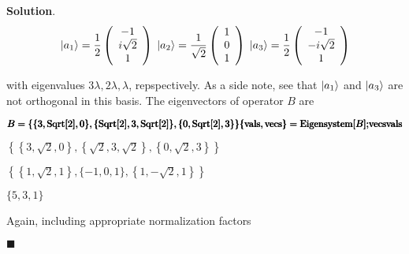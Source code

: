 \documentclass[12pt]{article}
\theoremstyle{definition}
\newenvironment{s}{%
        \begin{trivlist} \item \textbf{Solution}. }{%
            \hspace*{\fill} $\blacksquare$\end{trivlist}}%
\begin{document}
{\begin{s}
\begin{equation*}
\ket{a_{1}} = \frac{1}{2}\left(
\begin{array}{ccc}
 -1 \\i \sqrt{2} \\ 1 \\
\end{array}
\right)\;
\ket{a_{2}} = \frac{1}{\sqrt{2}}\left(
\begin{array}{ccc}
 1 \\ 0 \\ 1 \\
\end{array}
\right)\;
\ket{a_{3}} = \frac{1}{2}\left(
\begin{array}{ccc}
 -1 \\ -i \sqrt{2} \\ 1 \\
\end{array}
\right)
\end{equation*}

with eigenvalues $3\lambda, 2\lambda, \lambda$, repspectively. As a side note, see that $\ket{a_{1}}$ and $\ket{a_{3}}$ are not orthogonal in this basis. The eigenvectors of operator $B$ are

\begin{doublespace}
\noindent\(\pmb{B=\{\{3,\text{Sqrt}[2],0\},\{\text{Sqrt}[2],3,\text{Sqrt}[2]\},\{0,\text{Sqrt}[2],3\}\}}\\
\pmb{\{\text{vals},\text{vecs}\}=\text{Eigensystem}[B];}\\
\pmb{\text{vecs}}\\
\pmb{\text{vals}}\)
\end{doublespace}

\begin{doublespace}
\noindent\(\left\{\left\{3,\sqrt{2},0\right\},\left\{\sqrt{2},3,\sqrt{2}\right\},\left\{0,\sqrt{2},3\right\}\right\}\)
\end{doublespace}

\begin{doublespace}
\noindent\(\left\{\left\{1,\sqrt{2},1\right\},\{-1,0,1\},\left\{1,-\sqrt{2},1\right\}\right\}\)
\end{doublespace}

\begin{doublespace}
\noindent\(\{5,3,1\}\)
\end{doublespace}

Again, including appropriate normalization factors


\end{s}}
\end{document}
